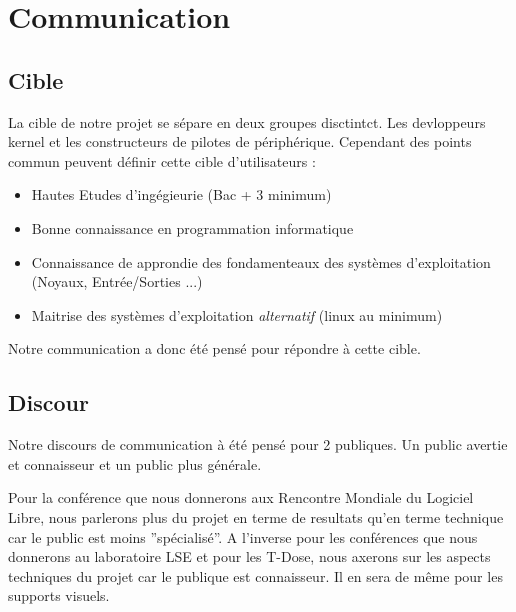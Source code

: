 \documentclass[francais]{rtxreport}
\begin{document}
\chapter{Communication}




\section {Cible}
La cible de notre projet se sépare en deux groupes disctintct.  Les devloppeurs
kernel et les constructeurs de pilotes de périphérique.  Cependant des points
commun peuvent définir cette cible d'utilisateurs :

\begin {itemize}
\item Hautes Etudes d'ingégieurie (Bac + 3 minimum)
\item Bonne connaissance en programmation informatique
\item Connaissance de approndie des fondamenteaux des systèmes d'exploitation
  (Noyaux, Entrée/Sorties ...)
\item Maitrise des systèmes d'exploitation \textit{alternatif} (linux au
  minimum)
\end{itemize}

Notre communication a donc été pensé pour répondre à cette cible.

\section {Discour}

Notre discours de communication à été pensé pour 2 publiques. Un public avertie et connaisseur et un public plus générale. 

Pour la conférence que nous donnerons aux Rencontre Mondiale du Logiciel Libre, nous parlerons plus du projet en terme de resultats qu'en terme technique car le public est moins ''spécialisé''. A l'inverse pour les conférences que nous donnerons au laboratoire LSE et pour les T-Dose, nous axerons sur les aspects techniques du projet car le publique est connaisseur.
Il en sera de même pour les supports visuels.


\end{document}
